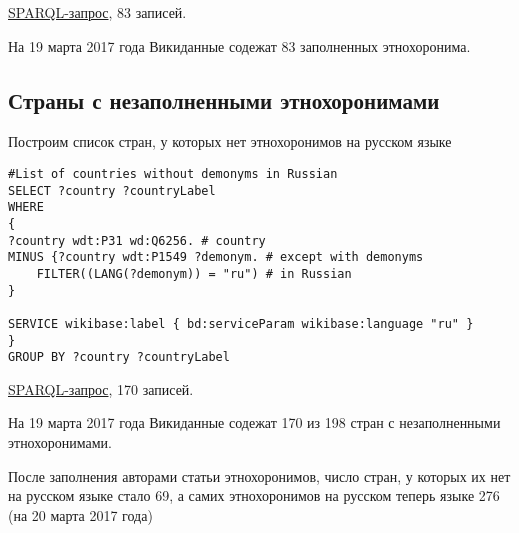 \href{https://query.wikidata.org/#%23List%20of%20demonyms%20in%20Russian%0ASELECT%20%3Fcountry%20%3FcountryLabel%20%3Fdemonym%0AWHERE%0A%7B%0A%09%3Fcountry%20wdt%3AP31%20wd%3AQ6256.%20%20%20%20%20%20%23country%0A%09%3Fcountry%20wdt%3AP1549%20%3Fdemonym%20.%20%20%20%23demonym%0A%09FILTER%28%28LANG%28%3Fdemonym%29%29%20%3D%20%22ru%22%29%0A%09SERVICE%20wikibase%3Alabel%20%7B%20bd%3AserviceParam%20wikibase%3Alanguage%20%22ru%22%20%7D%0A%7D}{SPARQL-запрос}, 83 записей.

На 19 марта 2017 года Викиданные содежат 83 заполненных этнохоронима.

\subsection{Страны с незаполненными этнохоронимами}

Построим список стран, у которых нет этнохоронимов на русском языке

\begin{lstlisting}[language=SPARQL]
#List of countries without demonyms in Russian
SELECT ?country ?countryLabel 
WHERE
{
?country wdt:P31 wd:Q6256. # country
MINUS {?country wdt:P1549 ?demonym. # except with demonyms
    FILTER((LANG(?demonym)) = "ru") # in Russian
} 

SERVICE wikibase:label { bd:serviceParam wikibase:language "ru" }
}
GROUP BY ?country ?countryLabel
\end{lstlisting}

\href{https://query.wikidata.org/#%23List%20of%20countries%20without%20demonyms%20in%20Russian%0ASELECT%20%3Fcountry%20%3FcountryLabel%20%0AWHERE%0A%7B%0A%09%3Fcountry%20wdt%3AP31%20wd%3AQ6256.%20%20%20%20%20%20%20%20%20%20%20%20%20%20%23%20country%0A%09MINUS%20%7B%20%3Fcountry%20wdt%3AP1549%20%3Fdemonym.%20%20%20%20%23%20except%20with%20demonyms%0A%20%20%20%20%20%20%20%20%20%20%20%20FILTER%28%28LANG%28%3Fdemonym%29%29%20%3D%20%22ru%22%29%20%23%20in%20Russian%0A%20%20%20%20%20%20%20%20%20%20%7D%20%20%20%20%0A%20%20%20%20%0A%09SERVICE%20wikibase%3Alabel%20%7B%20bd%3AserviceParam%20wikibase%3Alanguage%20%22ru%22%20%7D%0A%7D%0AGROUP%20BY%20%3Fcountry%20%3FcountryLabel}{SPARQL-запрос}, 170 записей. 

На 19 марта 2017 года Викиданные содежат 170 из 198 стран с незаполненными этнохоронимами.

После заполнения авторами статьи этнохоронимов, число стран, у которых их нет на русском языке стало 69, а самих этнохоронимов на русском теперь языке 276 (на 20 марта 2017 года)

